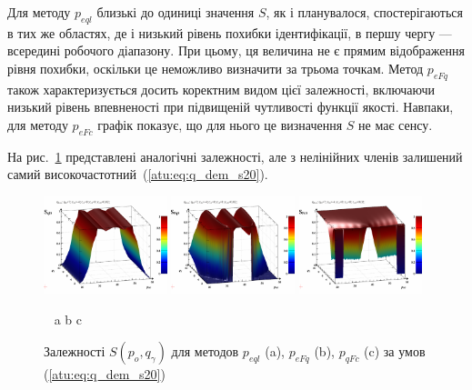 Для методу $p_{eql}$ близькі до одиниці значення $S$, як і планувалося,
спостерігаються в тих же областях, де і низький рівень похибки ідентифікації, в
першу чергу --- всередині робочого діапазону. При цьому, ця величина не є
прямим відображення рівня похибки, оскільки це неможливо визначити за трьома точкам.
Метод $p_{eFq}$ також характеризується досить коректним видом цієї залежності,
включаючи низький рівень впевненості при підвищеній чутливості функції якості.
Навпаки, для методу $p_{eFc}$ графік показує, що для нього це визначення $S$ не має сенсу.


На рис.~\ref{atu:f:qsl_S_po_qg_s20} представлені аналогічні залежності,
але з нелінійних членів залишений самий високочастотний~(\ref{atu:eq:q_dem_s20}).

\begin{figure}[htb!]
  \begin{center}
    \includegraphics[width=0.32\textwidth]{p/qls_pe-p_po_qg_Sql_s20.png}
    \hfill
    \includegraphics[width=0.32\textwidth]{p/qls_pe-p_po_qg_SFq_s20.png}
    \hfill
    \includegraphics[width=0.32\textwidth]{p/qls_pe-p_po_qg_SFc_s20.png}
  \end{center}
  \vspace{-1.0ex}
  \begin{center}
    ~ \hfill a \hfill\hfill b \hfill\hfill c \hfill ~
  \end{center}
  \vspace{-1.5ex}
  \caption{Залежності $S(p_o,q_\gamma)$ для методов $p_{eql}$ (a), $p_{eFq}$ (b), $p_{qFc}$ (c) за умов (\ref{atu:eq:q_dem_s20})}
  \label{atu:f:qsl_S_po_qg_s20}
\end{figure}

